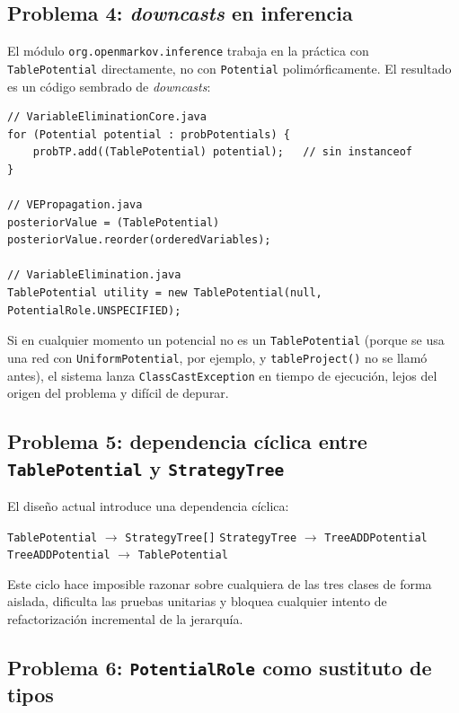 \documentclass[11pt,a4paper]{article}
\newcommand{\code}[1]{\texttt{#1}}
\begin{document}
\subsection{Problema 4: \emph{downcasts} en inferencia}
\label{sec:prob4}

El módulo \code{org.openmarkov.inference} trabaja en la práctica con
\code{TablePotential} directamente, no con \code{Potential}
polimórficamente.  El resultado es un código sembrado de \emph{downcasts}:

\begin{lstlisting}[caption={\emph{Downcasts} desprotegidos en el motor de inferencia}]
// VariableEliminationCore.java
for (Potential potential : probPotentials) {
    probTP.add((TablePotential) potential);   // sin instanceof
}

// VEPropagation.java
posteriorValue = (TablePotential) posteriorValue.reorder(orderedVariables);

// VariableElimination.java
TablePotential utility = new TablePotential(null, PotentialRole.UNSPECIFIED);
\end{lstlisting}

Si en cualquier momento un potencial no es un \code{TablePotential} (porque se usa
una red con \code{UniformPotential}, por ejemplo, y \code{tableProject()} no se
llamó antes), el sistema lanza \code{ClassCastException} en tiempo de ejecución,
lejos del origen del problema y difícil de depurar.

\subsection{Problema 5: dependencia cíclica entre \code{TablePotential} y \code{StrategyTree}}
\label{sec:prob5}

El diseño actual introduce una dependencia cíclica:

\begin{center}
\code{TablePotential} $\longrightarrow$ \code{StrategyTree[]}
\hspace{1em}
\code{StrategyTree} $\longrightarrow$ \code{TreeADDPotential}
\hspace{1em}
\code{TreeADDPotential} $\longrightarrow$ \code{TablePotential}
\end{center}

Este ciclo hace imposible razonar sobre cualquiera de las tres clases de forma
aislada, dificulta las pruebas unitarias y bloquea cualquier intento de
refactorización incremental de la jerarquía.

\subsection{Problema 6: \code{PotentialRole} como sustituto de tipos}
\label{sec:prob6}
\end{document}
